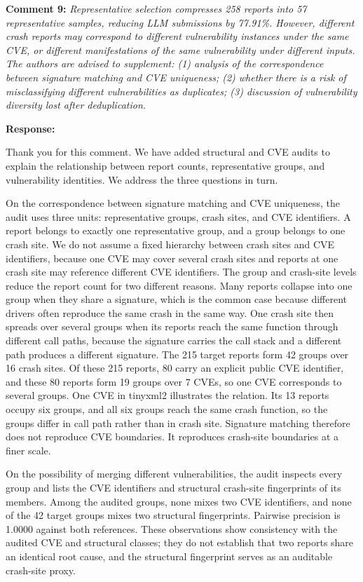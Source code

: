 \documentclass[onecolumn,11pt]{article}
\newcommand{\secc}[2]{\par\mySep \noindent \textsf{\textbf{#1 }}\textit{#2}\par}
\newcommand{\secr}[2]{\par\mySep \noindent \textsf{\textbf{#1 }}{#2}\par}
\newcommand{\mySep}{\vspace{8pt}}
\begin{document}
\secc{Comment 9:}{Representative selection compresses 258 reports into 57 representative samples, reducing LLM submissions by 77.91\%. However, different crash reports may correspond to different vulnerability instances under the same CVE, or different manifestations of the same vulnerability under different inputs. The authors are advised to supplement: (1) analysis of the correspondence between signature matching and CVE uniqueness; (2) whether there is a risk of misclassifying different vulnerabilities as duplicates; (3) discussion of vulnerability diversity lost after deduplication.}
\secr{Response:}{Thank you for this comment. We have added structural and CVE audits to explain the relationship between report counts, representative groups, and vulnerability identities. We address the three questions in turn.

On the correspondence between signature matching and CVE uniqueness, the audit uses three units: representative groups, crash sites, and CVE identifiers. A report belongs to exactly one representative group, and a group belongs to one crash site. We do not assume a fixed hierarchy between crash sites and CVE identifiers, because one CVE may cover several crash sites and reports at one crash site may reference different CVE identifiers. The group and crash-site levels reduce the report count for two different reasons. Many reports collapse into one group when they share a signature, which is the common case because different drivers often reproduce the same crash in the same way. One crash site then spreads over several groups when its reports reach the same function through different call paths, because the signature carries the call stack and a different path produces a different signature. The 215 target reports form 42 groups over 16 crash sites. Of these 215 reports, 80 carry an explicit public CVE identifier, and these 80 reports form 19 groups over 7 CVEs, so one CVE corresponds to several groups. One CVE in tinyxml2 illustrates the relation. Its 13 reports occupy six groups, and all six groups reach the same crash function, so the groups differ in call path rather than in crash site. Signature matching therefore does not reproduce CVE boundaries. It reproduces crash-site boundaries at a finer scale.

On the possibility of merging different vulnerabilities, the audit inspects every group and lists the CVE identifiers and structural crash-site fingerprints of its members. Among the audited groups, none mixes two CVE identifiers, and none of the 42 target groups mixes two structural fingerprints. Pairwise precision is 1.0000 against both references. These observations show consistency with the audited CVE and structural classes; they do not establish that two reports share an identical root cause, and the structural fingerprint serves as an auditable crash-site proxy.

}
\end{document}
